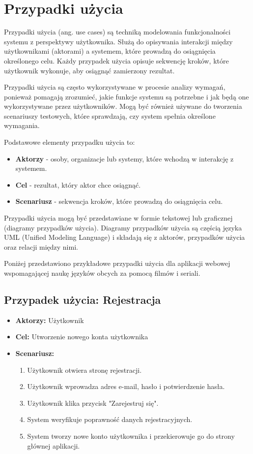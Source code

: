 \section{Przypadki użycia}
Przypadki użycia (ang. use cases) są techniką modelowania funkcjonalności systemu z perspektywy użytkownika. Służą do opisywania interakcji między użytkownikami (aktorami) a systemem, które prowadzą do osiągnięcia określonego celu. Każdy przypadek użycia opisuje sekwencję kroków, które użytkownik wykonuje, aby osiągnąć zamierzony rezultat.

Przypadki użycia są często wykorzystywane w procesie analizy wymagań, ponieważ pomagają zrozumieć, jakie funkcje systemu są potrzebne i jak będą one wykorzystywane przez użytkowników. Mogą być również używane do tworzenia scenariuszy testowych, które sprawdzają, czy system spełnia określone wymagania.

Podstawowe elementy przypadku użycia to:
\begin{itemize}
    \item \textbf{Aktorzy} - osoby, organizacje lub systemy, które wchodzą w interakcję z systemem.
    \item \textbf{Cel} - rezultat, który aktor chce osiągnąć.
    \item \textbf{Scenariusz} - sekwencja kroków, które prowadzą do osiągnięcia celu.
\end{itemize}

Przypadki użycia mogą być przedstawiane w formie tekstowej lub graficznej (diagramy przypadków użycia). Diagramy przypadków użycia są częścią języka UML (Unified Modeling Language) i składają się z aktorów, przypadków użycia oraz relacji między nimi.

Poniżej przedstawiono przykładowe przypadki użycia dla aplikacji webowej wspomagającej naukę języków obcych za pomocą filmów i seriali.
\subsection{Przypadek użycia: Rejestracja}
\begin{itemize}
    \item \textbf{Aktorzy:} Użytkownik
    \item \textbf{Cel:} Utworzenie nowego konta użytkownika
    \item \textbf{Scenariusz:}
          \begin{enumerate}
              \item Użytkownik otwiera stronę rejestracji.
              \item Użytkownik wprowadza adres e-mail, hasło i potwierdzenie hasła.
              \item Użytkownik klika przycisk "Zarejestruj się".
              \item System weryfikuje poprawność danych rejestracyjnych.
              \item System tworzy nowe konto użytkownika i przekierowuje go do strony głównej aplikacji.
          \end{enumerate}
\end{itemize}

